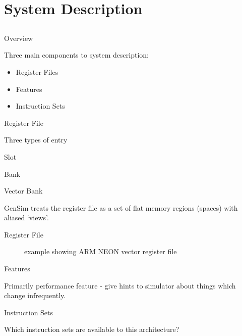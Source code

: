 \section{System Description}
\subsection{}

\begin{frame}{Overview}

Three main components to system description:
\begin{itemize}
\item Register Files
\item Features
\item Instruction Sets
\end{itemize}

\end{frame}

\begin{frame}{Register File}

Three types of entry

Slot

Bank

Vector Bank

GenSim treats the register file as a set of flat memory regions (spaces)
with aliased `views'.

\end{frame}

\begin{frame}{Register File}

\begin{figure}
example showing ARM NEON vector register file
\end{figure}

\end{frame}

\begin{frame}{Features}

Primarily performance feature - give hints to simulator about things 
which change infrequently.

\end{frame}

\begin{frame}{Instruction Sets}

Which instruction sets are available to this architecture?

\end{frame}
